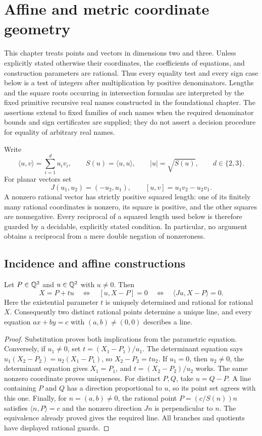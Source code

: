 \section{Affine and metric coordinate geometry}
\label{sec:affine-metric}

This chapter treats points and vectors in dimensions two and three. Unless
explicitly stated otherwise their coordinates, the coefficients of equations,
and construction parameters are rational. Thus every equality test and every
sign case below is a test of integers after multiplication by positive
denominators. Lengths and the square roots occurring in intersection formulas
are interpreted by the fixed primitive recursive real names constructed in the
foundational chapter. The assertions extend to fixed families of such names
when the required denominator bounds and sign certificates are supplied;
they do not assert a decision procedure for equality of arbitrary real names.

Write
\[
 \langle u,v\rangle=\sum_{i=1}^{d}u_iv_i,\qquad
 S(u)=\langle u,u\rangle,\qquad |u|=\sqrt{S(u)},\qquad d\in\{2,3\}.
\]
For planar vectors set
\[
 J(u_1,u_2)=(-u_2,u_1),\qquad [u,v]=u_1v_2-u_2v_1.
\]
A nonzero rational vector has strictly positive squared length: one of its
finitely many rational coordinates is nonzero, its square is positive, and
the other squares are nonnegative. Every reciprocal of a squared length
used below is therefore guarded by a decidable, explicitly stated condition.
In particular, no argument obtains a reciprocal from a mere double negation
of nonzeroness.

\subsection{Incidence and affine constructions}

\begin{theorem}
\label{geo:line}
Let $P\in\mathbb Q^2$ and $u\in\mathbb Q^2$ with $u\ne0$. Then
\[
 X=P+tu\quad\Longleftrightarrow\quad [u,X-P]=0
 \quad\Longleftrightarrow\quad \langle Ju,X-P\rangle=0.
\]
Here the existential parameter $t$ is uniquely determined and rational for
rational $X$. Consequently two distinct rational points determine a unique
line, and every equation $ax+by=c$ with $(a,b)\ne(0,0)$ describes a line.
\end{theorem}
\begin{proof}
Substitution proves both implications from the parametric equation. Conversely,
if $u_1\ne0$, set $t=(X_1-P_1)/u_1$. The determinant equation says
$u_1(X_2-P_2)=u_2(X_1-P_1)$, so $X_2-P_2=tu_2$.
If $u_1=0$, then $u_2\ne0$, the determinant equation gives $X_1=P_1$,
and $t=(X_2-P_2)/u_2$ works. The same nonzero coordinate proves uniqueness.
For distinct $P,Q$, take $u=Q-P$. A line containing $P$ and $Q$ has a
direction proportional to $u$, so its point set agrees with this one.
Finally, for $n=(a,b)\ne0$, the rational point
$P=(c/S(n))n$ satisfies $\langle n,P\rangle=c$ and the nonzero direction
$Jn$ is perpendicular to $n$. The equivalence already proved gives the
required line. All branches and quotients have displayed rational guards.
\end{proof}

